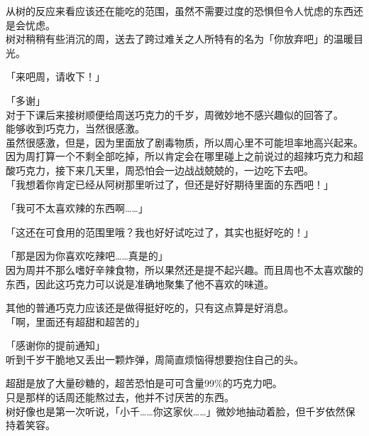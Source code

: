 从树的反应来看应该还在能吃的范围，虽然不需要过度的恐惧但令人忧虑的东西还是会忧虑。\\

树对稍稍有些消沉的周，送去了跨过难关之人所特有的名为「你放弃吧」的温暖目光。\\

\vspace{2\baselineskip}

「来吧周，请收下！」

「多谢」\\

对于下课后来接树顺便给周送巧克力的千岁，周微妙地不感兴趣似的回答了。\\

能够收到巧克力，当然很感激。\\

虽然很感激，但是，因为里面放了剧毒物质，所以周心里不可能坦率地高兴起来。\\

因为周打算一个不剩全部吃掉，所以肯定会在哪里碰上之前说过的超辣巧克力和超酸巧克力，接下来几天里，周恐怕会一边战战兢兢的，一边吃下去吧。\\

「我想着你肯定已经从阿树那里听过了，但还是好好期待里面的东西吧！」

「我可不太喜欢辣的东西啊……」

「这还在可食用的范围里哦？我也好好试吃过了，其实也挺好吃的！」

「那是因为你喜欢吃辣吧……真是的」\\

因为周并不那么嗜好辛辣食物，所以果然还是提不起兴趣。而且周也不太喜欢酸的东西，因此这巧克力可以说是准确地聚集了他不喜欢的味道。

其他的普通巧克力应该还是做得挺好吃的，只有这点算是好消息。\\

「啊，里面还有超甜和超苦的」

「感谢你的提前通知」\\

听到千岁干脆地又丢出一颗炸弹，周简直烦恼得想要抱住自己的头。

超甜是放了大量砂糖的，超苦恐怕是可可含量99\%的巧克力吧。\\

只是那样的话周还能熬过去，他并不讨厌苦的东西。\\

树好像也是第一次听说，「小千……你这家伙……」微妙地抽动着脸，但千岁依然保持着笑容。\\

